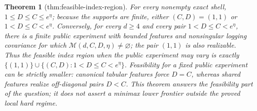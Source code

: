 \documentclass{article}
\newtheorem{theorem}{Theorem}
\begin{document}
\begin{theorem}[thm:feasible-index-region]\label{thm:feasible-index-region}
For every nonempty exact shell, \(1\le D\le C\le e^\eta\); because the supports are finite, either \((C,D)=(1,1)\) or \(1<D\le C<e^\eta\). Conversely, for every \(d\ge4\) and every pair \(1<D\le C<e^\eta\), there is a finite public experiment with bounded features and nonsingular logging covariance for which \(\mathcal M(d,C,D,\eta)\ne\varnothing\); the pair \((1,1)\) is also realizable. Thus the feasible index region when the public experiment may vary is exactly \(\{(1,1)\}\cup\{(C,D):1<D\le C<e^\eta\}\). Feasibility for a fixed public experiment can be strictly smaller: canonical tabular features force \(D=C\), whereas shared features realize off-diagonal pairs \(D<C\). This theorem answers the feasibility part of the question; it does not assert a minimax lower frontier outside the proved local hard regime.
\end{theorem}
\end{document}
